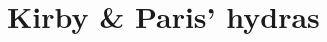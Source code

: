 \documentclass[10pt, fleqn]{beamer}
\begin{document}






\section{Kirby \& Paris' hydras}
\end{document}
